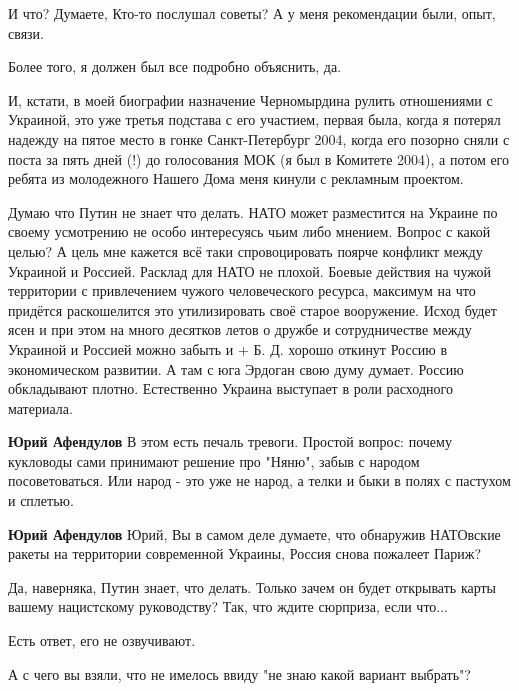 \begin{itemize}
И что? Думаете, Кто-то послушал советы? А у меня рекомендации были, опыт,
связи.

Более того, я должен был все подробно объяснить, да.

И, кстати, в моей биографии назначение Черномырдина рулить отношениями с
Украиной, это уже третья подстава с его участием, первая была, когда я потерял
надежду на пятое место в гонке Санкт-Петербург 2004, когда его позорно сняли с
поста за пять дней (!) до голосования МОК (я был в Комитете 2004), а потом его
ребята из молодежного Нашего Дома меня кинули с рекламным проектом.


Думаю что Путин не знает что делать. НАТО может разместится на Украине по
своему усмотрению не особо интересуясь чьим либо мнением. Вопрос с какой целью?
А цель мне кажется всё таки спровоцировать поярче конфликт между Украиной и
Россией. Расклад для НАТО не плохой. Боевые действия на чужой территории с
привлечением чужого человеческого ресурса, максимум на что придётся
раскошелится это утилизировать своё старое вооружение. Исход будет ясен и при
этом на много десятков летов о дружбе и сотрудничестве между Украиной и Россией
можно забыть и + Б. Д. хорошо откинут Россию в экономическом развитии. А там с
юга Эрдоган свою думу думает. Россию обкладывают плотно. Естественно Украина
выступает в роли расходного материала.

\begin{itemize} %
\textbf{Юрий Афендулов} В этом есть печаль тревоги. Простой вопрос: почему кукловоды сами принимают решение про "Няню", забыв с народом посоветоваться. Или народ - это уже не народ, а телки и быки в полях с пастухом и сплетью.

\textbf{Юрий Афендулов} Юрий, Вы в самом деле думаете, что обнаружив НАТОвские ракеты на территории современной Украины, Россия снова пожалеет Париж?
\end{itemize} %


Да, наверняка, Путин знает, что делать. Только зачем он будет открывать карты
вашему нацистскому руководству? Так, что ждите сюрприза, если что...

Есть ответ, его не озвучивают.


А с чего вы взяли, что не имелось ввиду "не знаю какой вариант выбрать"?


\end{itemize}
